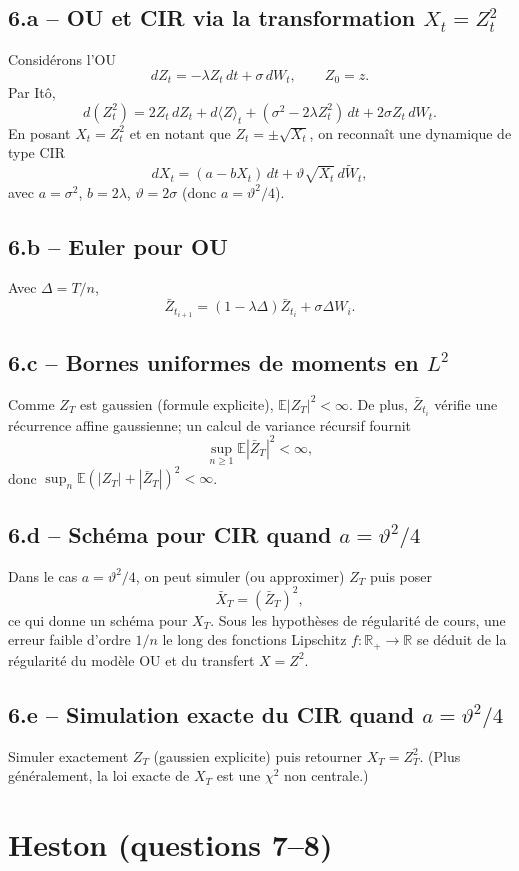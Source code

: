 \documentclass[11pt,a4paper]{article}
\newcommand{\E}{\mathbb{E}}
\newcommand{\R}{\mathbb{R}}
\newcommand{\1}{\mathbbm{1}}
\theoremstyle{plain}
\theoremstyle{definition}
\begin{document}
\subsection{6.a -- OU et CIR via la transformation $X_t=Z_t^2$}
Considérons l'OU
\[
dZ_t=-\lambda Z_t\,dt+\sigma\,dW_t,\qquad Z_0=z.
\]
Par Itô,
\[
d(Z_t^2)=2Z_t\,dZ_t+d\langle Z\rangle_t
+(\sigma^2-2\lambda Z_t^2)\,dt+2\sigma Z_t\,dW_t.
\]
En posant $X_t=Z_t^2$ et en notant que $Z_t=\pm\sqrt{X_t}$, on reconnaît une dynamique de type CIR
\[
dX_t=(a-bX_t)\,dt+\vartheta\sqrt{X_t}\,d\widetilde W_t,
\]
avec $a=\sigma^2$, $b=2\lambda$, $\vartheta=2\sigma$ (donc $a=\vartheta^2/4$).

\subsection{6.b -- Euler pour OU}
Avec $\Delta=T/n$,
\[
\bar Z_{t_{i+1}}=(1-\lambda\Delta)\bar Z_{t_i}+\sigma\Delta W_i.
\]

\subsection{6.c -- Bornes uniformes de moments en $L^2$}
Comme $Z_T$ est gaussien (formule explicite), $\E|Z_T|^2<\infty$. De plus, $\bar Z_{t_i}$ vérifie une récurrence affine gaussienne; un calcul de variance récursif fournit
\[
\sup_{n\ge 1}\E|\bar Z_T|^2<\infty,
\]
donc $\sup_n \E(|Z_T|+|\bar Z_T|)^2<\infty$.

\subsection{6.d -- Schéma pour CIR quand $a=\vartheta^2/4$}
Dans le cas $a=\vartheta^2/4$, on peut simuler (ou approximer) $Z_T$ puis poser
\[
\bar X_T=(\bar Z_T)^2,
\]
ce qui donne un schéma pour $X_T$.
Sous les hypothèses de régularité de cours, une erreur faible d'ordre $1/n$ le long des fonctions Lipschitz $f:\R_+\to\R$ se déduit de la régularité du modèle OU et du transfert $X=Z^2$.

\subsection{6.e -- Simulation exacte du CIR quand $a=\vartheta^2/4$}
Simuler exactement $Z_T$ (gaussien explicite) puis retourner $X_T=Z_T^2$.
(Plus généralement, la loi exacte de $X_T$ est une $\chi^2$ non centrale.)

\section{Heston (questions 7--8)}
\end{document}

